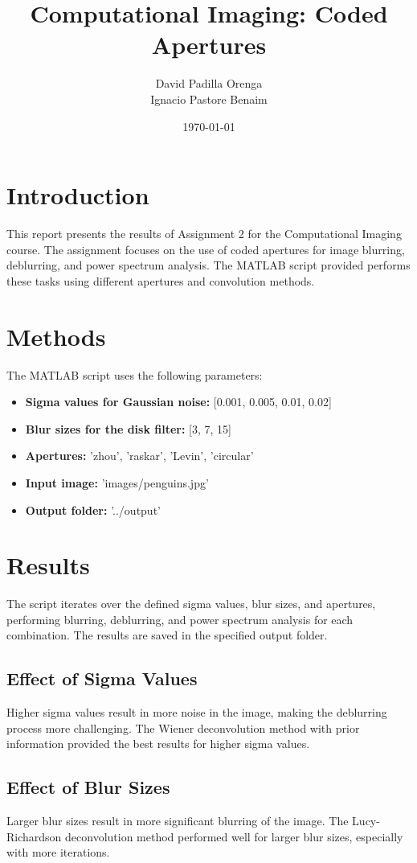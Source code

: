 \documentclass[a4paper,10pt]{article}
\title{Computational Imaging: Coded Apertures}
\author{David Padilla Orenga \\ Ignacio Pastore Benaim}
\date{\today}
\begin{document}
\maketitle
\thispagestyle{empty}
\newpage
\setcounter{page}{1}

\section{Introduction}
This report presents the results of Assignment 2 for the Computational Imaging course. The assignment focuses on the use of coded apertures for image blurring, deblurring, and power spectrum analysis. The MATLAB script provided performs these tasks using different apertures and convolution methods.

\section{Methods}
The MATLAB script uses the following parameters:
\begin{itemize}
    \item \textbf{Sigma values for Gaussian noise:} [0.001, 0.005, 0.01, 0.02]
    \item \textbf{Blur sizes for the disk filter:} [3, 7, 15]
    \item \textbf{Apertures:} {'zhou', 'raskar', 'Levin', 'circular'}
    \item \textbf{Input image:} 'images/penguins.jpg'
    \item \textbf{Output folder:} '../output'
\end{itemize}

\section{Results}
The script iterates over the defined sigma values, blur sizes, and apertures, performing blurring, deblurring,
 and power spectrum analysis for each combination. The results are saved in the specified output folder.

\subsection{Effect of Sigma Values}
Higher sigma values result in more noise in the image, making the deblurring process more challenging. 
The Wiener deconvolution method with prior information provided the best results for higher sigma values.

\subsection{Effect of Blur Sizes}
Larger blur sizes result in more significant blurring of the image. The Lucy-Richardson deconvolution method 
performed well for larger blur sizes, especially with more iterations.
\end{document}
